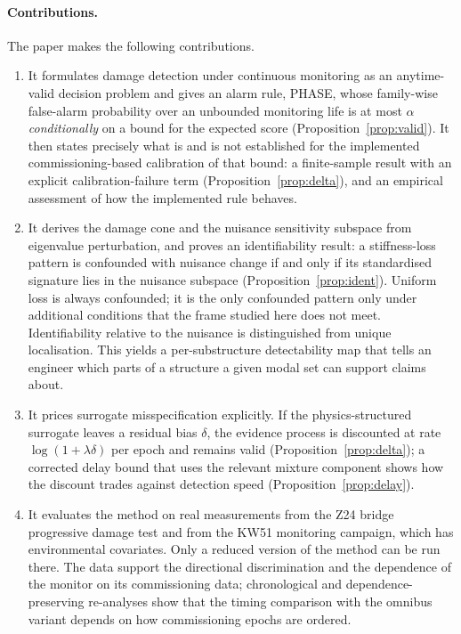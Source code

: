 \documentclass[12pt,a4paper]{article}
\newcommand{\rev}[1]{#1}
\newcommand{\rev}[1]{{\color{revcol}#1}}
\begin{document}
\paragraph{Contributions.} The paper makes the following contributions.
\begin{enumerate}
\item It formulates damage detection under continuous monitoring as an anytime-valid decision problem and gives an alarm rule, PHASE, whose family-wise false-alarm probability over an unbounded monitoring life is at most $\alpha$ \emph{conditionally} on a bound for the expected score (Proposition~\ref{prop:valid}). \rev{It then states precisely what is and is not established for the implemented commissioning-based calibration of that bound: a finite-sample result with an explicit calibration-failure term (Proposition~\ref{prop:delta}), and an empirical assessment of how the implemented rule behaves.}
\item It derives the damage cone and the nuisance sensitivity subspace from eigenvalue perturbation, and proves an identifiability result: a stiffness-loss pattern is confounded with nuisance change if and only if its standardised signature lies in the nuisance subspace (Proposition~\ref{prop:ident}). \rev{Uniform loss is always confounded; it is the only confounded pattern only under additional conditions that the frame studied here does not meet. Identifiability relative to the nuisance is distinguished from unique localisation.} This yields a per-substructure detectability map that tells an engineer which parts of a structure a given modal set can \rev{support claims about}.
\item It prices surrogate misspecification explicitly. If the physics-structured surrogate leaves a residual bias $\delta$, the evidence process is discounted at rate $\log(1+\lambda\delta)$ per epoch and remains valid (Proposition~\ref{prop:delta}); \rev{a corrected delay bound that uses the relevant mixture component} shows how the discount trades against detection speed (Proposition~\ref{prop:delay}).
\item It evaluates the method on real measurements from the Z24 bridge progressive damage test \rev{and from the KW51 monitoring campaign, which has environmental covariates}. \rev{Only a reduced version of the method can be run there. The data support the directional discrimination and the dependence of the monitor on its commissioning data; chronological and dependence-preserving re-analyses show that the timing comparison with the omnibus variant depends on how commissioning epochs are ordered.}

\end{enumerate}
\end{document}
